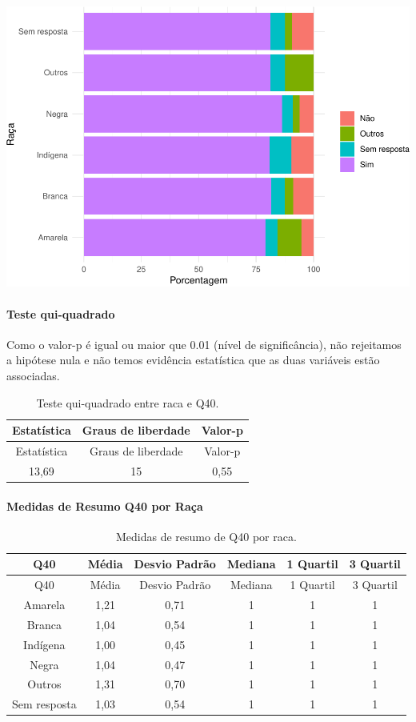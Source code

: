 \documentclass[]{article}
\let\oldparagraph\paragraph
\renewcommand{\paragraph}[1]{\oldparagraph{#1}\mbox{}}
\begin{document}
\begin{center}\includegraphics[width=0.75\linewidth]{relatorio_covid19_files/figure-latex/unnamed-chunk-1577-1} \end{center}

\hypertarget{teste-qui-quadrado-135}{%
\paragraph{Teste qui-quadrado}\label{teste-qui-quadrado-135}}

Como o valor-p é igual ou maior que 0.01 (nível de significância), não rejeitamos a hipótese nula e não temos evidência estatística que as duas variáveis estão associadas.

\begin{longtable}[]{@{}ccc@{}}
\caption{\label{tab:unnamed-chunk-1579}Teste qui-quadrado entre raca e Q40.}\tabularnewline
\toprule
Estatística & Graus de liberdade & Valor-p\tabularnewline
\midrule
\endfirsthead
\toprule
Estatística & Graus de liberdade & Valor-p\tabularnewline
\midrule
\endhead
13,69 & 15 & 0,55\tabularnewline
\bottomrule
\end{longtable}

\cleardoublepage

\hypertarget{medidas-de-resumo-q40-por-rauxe7a}{%
\paragraph{Medidas de Resumo Q40 por Raça}\label{medidas-de-resumo-q40-por-rauxe7a}}

\begin{longtable}[]{@{}cccccc@{}}
\caption{\label{tab:unnamed-chunk-1580}Medidas de resumo de Q40 por raca.}\tabularnewline
\toprule
Q40 & Média & Desvio Padrão & Mediana & 1 Quartil & 3 Quartil\tabularnewline
\midrule
\endfirsthead
\toprule
Q40 & Média & Desvio Padrão & Mediana & 1 Quartil & 3 Quartil\tabularnewline
\midrule
\endhead
Amarela & 1,21 & 0,71 & 1 & 1 & 1\tabularnewline
Branca & 1,04 & 0,54 & 1 & 1 & 1\tabularnewline
Indígena & 1,00 & 0,45 & 1 & 1 & 1\tabularnewline
Negra & 1,04 & 0,47 & 1 & 1 & 1\tabularnewline
Outros & 1,31 & 0,70 & 1 & 1 & 1\tabularnewline
Sem resposta & 1,03 & 0,54 & 1 & 1 & 1\tabularnewline
\bottomrule
\end{longtable}
\end{document}
